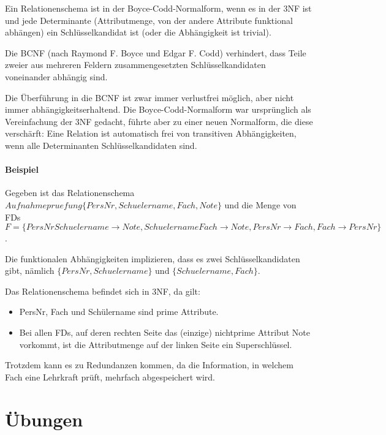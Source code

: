 \documentclass{lehramt-informatik}
\begin{document}
Ein Relationenschema ist in der Boyce-Codd-Normalform, wenn es in der
3NF ist und jede Determinante (Attributmenge, von der andere Attribute
funktional abhängen) ein Schlüsselkandidat ist (oder die Abhängigkeit
ist trivial).

Die BCNF (nach Raymond F. Boyce und Edgar F. Codd) verhindert, dass
Teile zweier aus mehreren Feldern zusammengesetzten Schlüsselkandidaten
voneinander abhängig sind.

Die Überführung in die BCNF ist zwar immer verlustfrei möglich, aber
nicht immer abhängigkeitserhaltend. Die Boyce-Codd-Normalform war
ursprünglich als Vereinfachung der 3NF gedacht, führte aber zu einer
neuen Normalform, die diese verschärft: Eine Relation ist automatisch
frei von transitiven Abhängigkeiten, wenn alle Determinanten
Schlüsselkandidaten sind.

\subsubsection{Beispiel}

Gegeben ist das Relationenschema
$Aufnahmepruefung\{PersNr, Schuelername, Fach, Note\}$
und die Menge von FDs
$F = \{
  PersNr Schuelername \rightarrow Note,
  Schuelername Fach \rightarrow Note,
  PersNr \rightarrow Fach,
  Fach \rightarrow PersNr
\}$.

Die funktionalen Abhängigkeiten implizieren, dass es zwei
Schlüsselkandidaten gibt, nämlich
$\{PersNr, Schuelername\}$ und
$\{Schuelername, Fach\}$.

Das Relationenschema befindet sich in 3NF, da gilt:

\begin{itemize}
\item PersNr, Fach und Schülername sind prime Attribute.

\item Bei allen FDs, auf deren rechten Seite das (einzige) nichtprime
Attribut Note vorkommt, ist die Attributmenge auf der linken Seite ein
Superschlüssel.
\end{itemize}

Trotzdem kann es zu Redundanzen kommen, da die Information, in welchem
Fach eine Lehrkraft prüft, mehrfach abgespeichert wird.

%

\chapter{Übungen}
\end{document}
